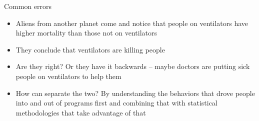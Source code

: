 \documentclass{beamer}
\begin{document}



\begin{frame}{Common errors}

  \begin{itemize}
    \item Aliens from another planet come and notice that people on ventilators have higher mortality than those not on ventilators
    \item They conclude that ventilators are killing people
    \item Are they right?  Or  they have it backwards -- maybe doctors are putting sick people on ventilators to help them
    \item How can separate the two?  By understanding the behaviors that drove people into and out of programs first and combining that with statistical methodologies that take advantage of that
  \end{itemize}

\end{frame}
\end{document}
